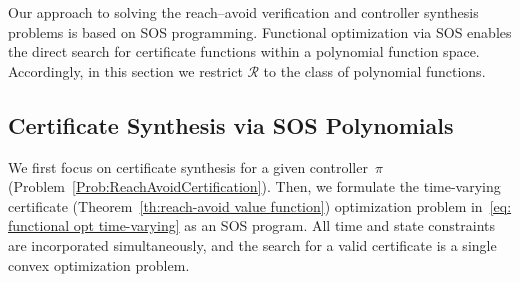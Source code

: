 \documentclass[journal,twoside,web]{ieeecolor}
\newcommand{\RA}{\mathcal{R}}
\theoremstyle{definition}
\theoremstyle{plain}
\theoremstyle{plain}
\begin{document}
Our approach to solving the reach–avoid verification and controller synthesis problems is based on SOS programming. Functional optimization via SOS enables the direct search for certificate functions within a polynomial function space. Accordingly, in this section we restrict $\RA$ to the class of polynomial functions.

\subsection{Certificate Synthesis via SOS Polynomials}


We first focus on certificate synthesis for a given controller~$\pi$ (Problem~\ref{Prob:ReachAvoidCertification}).  
Then, we formulate the time-varying certificate (Theorem~\ref{th:reach-avoid value function}) optimization problem in~\eqref{eq: functional opt time-varying} as an SOS program.
All time and state constraints are incorporated simultaneously, and the search for a valid certificate is a single convex optimization problem. 
\end{document}
